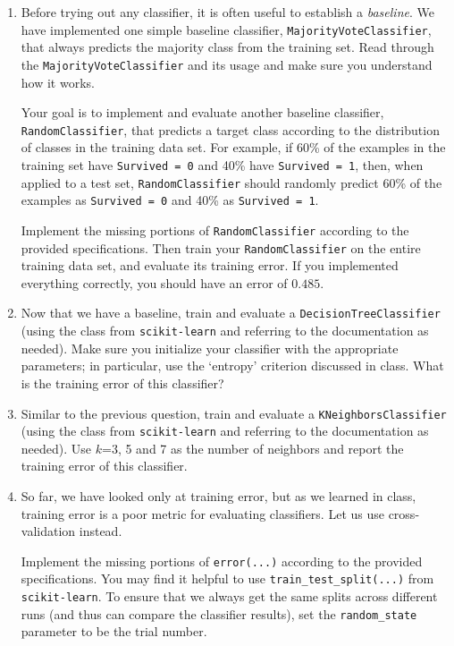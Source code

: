 \begin{enumerate}[resume]

\item {} Before trying out any classifier, it is often useful to establish a \emph{baseline}. We have implemented one simple baseline classifier, \verb|MajorityVoteClassifier|, that always predicts the majority class from the training set. Read through the \verb|MajorityVoteClassifier| and its usage and make sure you understand how it works.

Your goal is to implement and evaluate another baseline classifier, \verb|RandomClassifier|, that predicts a target class according to the distribution of classes in the training data set. For example, if 60\% of the examples in the training set have \verb|Survived = 0| and 40\% have \verb|Survived = 1|, then, when applied to a test set, \verb|RandomClassifier| should randomly predict 60\% of the examples as \verb|Survived = 0| and 40\% as \verb|Survived = 1|.

Implement the missing portions of \verb|RandomClassifier| according to the provided specifications. Then train your \verb|RandomClassifier| on the entire training data set, and evaluate its training error. If you implemented everything correctly, you should have an error of $0.485$.


\item {} Now that we have a baseline, train and evaluate a \verb|DecisionTreeClassifier| (using the class from \verb|scikit-learn| and referring to the documentation as needed). Make sure you initialize your classifier with the appropriate parameters; in particular, use the `entropy' criterion discussed in class. What is the training error of this classifier?


\item {} Similar to the previous question, train and evaluate a \verb|KNeighborsClassifier| (using the class from \verb|scikit-learn| and referring to the documentation as needed). Use $k$=3, 5 and 7 as the number of neighbors and report the training error of this classifier.


\item {} So far, we have looked only at training error, but as we learned in class, training error is a poor metric for evaluating classifiers. Let us use cross-validation instead.

Implement the missing portions of \verb|error(...)| according to the provided specifications. You may find it helpful to use \verb|train_test_split(...)| from \verb|scikit-learn|. To ensure that we always get the same splits across different runs (and thus can compare the classifier results), set the \verb|random_state| parameter to be the trial number.



\end{enumerate}
